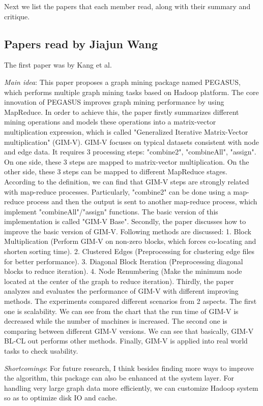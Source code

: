 Next we list the papers that each member read,
along with their summary and critique.

\subsection{Papers read by Jiajun Wang}
The first paper was by Kang et al.
\cite{Kang:2011ve}
\begin{itemize*}
\item {\em Main idea}: This paper proposes a graph mining package named PEGASUS, which performs multiple graph mining tasks based on Hadoop platform. The core innovation of PEGASUS improves graph mining performance by using MapReduce.
In order to achieve this, the paper firstly summarizes different mining operations and models these operations into a matrix-vector multiplication expression, which is called "Generalized Iterative Matrix-Vector multiplication" (GIM-V). GIM-V focuses on typical datasets consistent with node and edge data. It requires 3 processing steps: "combine2", "combineAll", "assign". On one side, these 3 steps are mapped to matrix-vector multiplication. On the other side, these 3 steps can be mapped to different MapReduce stages. According to the definition, we can find that GIM-V steps are strongly related with map-reduce processes. Particularly, "combine2" can be done using a map-reduce process and then the output is sent to another map-reduce process, which implement "combineAll"/"assign" functions. The basic version of this implementation is called "GIM-V Base".
Secondly, the paper discusses how to improve the basic version of GIM-V. Following methods are discussed: 1. Block Multiplication (Perform GIM-V on non-zero blocks, which forces co-locating and shorten sorting time). 2. Clustered Edges (Preprocessing for clustering edge files for better performance). 3. Diagonal Block Iteration (Preprocessing diagonal blocks to reduce iteration). 4. Node Renumbering (Make the minimum node located at the center of the graph to reduce iteration).
Thirdly, the paper analyzes and evaluates the performance of GIM-V with different improving methods. The experiments compared different scenarios from 2 aspects. The first one is scalability. We can see from the chart that the run time of GIM-V is decreased while the number of machines is increased. The second one is comparing between different GIM-V versions. We can see that basically, GIM-V BL-CL out performs other methods.
Finally, GIM-V is applied into real world tasks to check usability.
\item {\em Shortcomings}:
	For future research, I think besides finding more ways to improve the algorithm, this package can also be enhanced at the system layer. For handling very large graph data more efficiently, we can customize Hadoop system so as to optimize disk IO and cache.
\end{itemize*}

